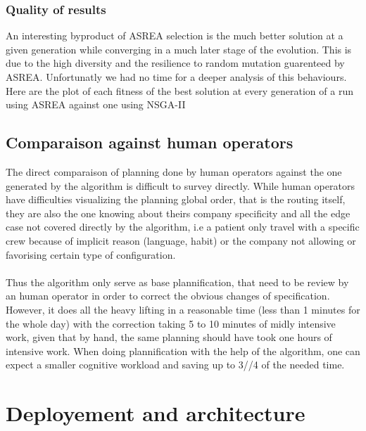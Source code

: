 \documentclass[12pt]{memoir}
\begin{document}
\subsubsection{Quality of results}
An interesting byproduct of ASREA selection is the much better solution at a given generation while converging
in a much later stage of the evolution. This is due to the high diversity and the resilience to random mutation 
guarenteed by ASREA. Unfortunatly we had no time for a deeper analysis of this behaviours. Here are the plot of 
each fitness of the best solution at every generation of a run using ASREA against one using NSGA-II 

\subsection{Comparaison against human operators}
The direct comparaison of planning done by human operators against the one generated by the algorithm is difficult 
to survey directly. While human operators have difficulties visualizing the planning global order, that is the routing
 itself, they are also the one knowing about theirs company specificity and all the edge case not covered directly by 
the algorithm, i.e a patient only travel with a specific crew because of implicit reason (language, habit) or the company 
not allowing or favorising certain type of configuration.\\
\\
Thus the algorithm only serve as base plannification, that need to be review by an human operator in order to correct 
the obvious changes of specification. However, it does all the heavy lifting in a reasonable time (less than 1 minutes 
for the whole day) with the correction taking 5 to 10 minutes of midly intensive work, given that by hand, the same planning
should have took one hours of intensive work. When doing plannification with the help of the algorithm, one can expect a smaller 
cognitive workload and saving up to 3//4 of the needed time.  

\section{Deployement and architecture}
\end{document}
